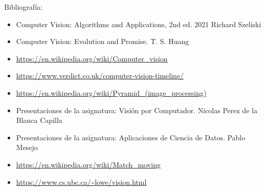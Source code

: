 \documentclass[13pt,a4paper]{article}
\begin{document}
    
    

    \newpage


     \newpage
     \newpage
    

\vspace{\baselineskip}
\vspace{\baselineskip}

Bibliografía:
\begin{itemize}
    \item Computer Vision: Algorithms and Applications, 2nd ed. 2021 Richard Szeliski
    \item Computer Vision: Evolution and Promise. T. S. Huang
    \item \url{https://en.wikipedia.org/wiki/Computer_vision}
    \item \url{https://www.verdict.co.uk/computer-vision-timeline/}
    \item \url{https://en.wikipedia.org/wiki/Pyramid_(image_processing)}
    \item Presentaciones de la asignatura: Visión por Computador. Nicolas Perez de la Blanca Capilla
    \item Presentaciones de la asignatura: Aplicaciones de Ciencia de Datos. Pablo Mesejo
    \item \url{https://en.wikipedia.org/wiki/Match_moving}
    \item \url{https://www.cs.ubc.ca/~lowe/vision.html}
\end{itemize}


    \setlength{\parskip}{1em}
    \newpage
\end{document}
